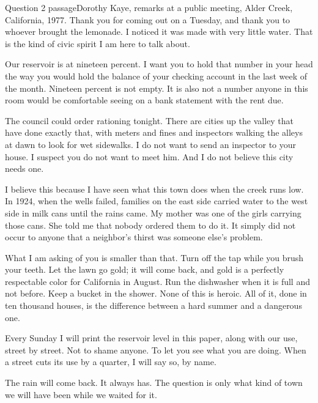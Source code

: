 \documentclass[11pt]{article}
\begin{document}
\begin{passage}{Question 2 passage}{Dorothy Kaye, remarks at a public meeting, Alder Creek, California, 1977.}
 Thank you for coming out on a Tuesday, and thank you to whoever brought the lemonade. I noticed it was made with very little water. That is the kind of civic spirit I am here to talk about.

 Our reservoir is at nineteen percent. I want you to hold that number in your head the way you would hold the balance of your checking account in the last week of the month. Nineteen percent is not empty. It is also not a number anyone in this room would be comfortable seeing on a bank statement with the rent due.

 The council could order rationing tonight. There are cities up the valley that have done exactly that, with meters and fines and inspectors walking the alleys at dawn to look for wet sidewalks. I do not want to send an inspector to your house. I suspect you do not want to meet him. And I do not believe this city needs one.

 I believe this because I have seen what this town does when the creek runs low. In 1924, when the wells failed, families on the east side carried water to the west side in milk cans until the rains came. My mother was one of the girls carrying those cans. She told me that nobody ordered them to do it. It simply did not occur to anyone that a neighbor's thirst was someone else's problem.

 What I am asking of you is smaller than that. Turn off the tap while you brush your teeth. Let the lawn go gold; it will come back, and gold is a perfectly respectable color for California in August. Run the dishwasher when it is full and not before. Keep a bucket in the shower. None of this is heroic. All of it, done in ten thousand houses, is the difference between a hard summer and a dangerous one.

 Every Sunday I will print the reservoir level in this paper, along with our use, street by street. Not to shame anyone. To let you see what you are doing. When a street cuts its use by a quarter, I will say so, by name.

 The rain will come back. It always has. The question is only what kind of town we will have been while we waited for it.
\end{passage}

\makekey
\end{document}
